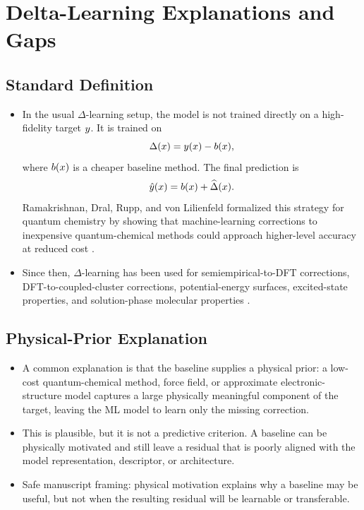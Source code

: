 \documentclass[11pt]{article}
\begin{document}
\section{Delta-Learning Explanations and Gaps}

\subsection*{Standard Definition}

\begin{itemize}
  \item In the usual \(\Delta\)-learning setup, the model is not trained directly on a high-fidelity target \(y\). It is trained on
  \[
    \Delta(x) = y(x) - b(x),
  \]
  where \(b(x)\) is a cheaper baseline method. The final prediction is
  \[
    \hat{y}(x) = b(x) + \widehat{\Delta}(x).
  \]
  Ramakrishnan, Dral, Rupp, and von Lilienfeld formalized this strategy for quantum chemistry by showing that machine-learning corrections to inexpensive quantum-chemical methods could approach higher-level accuracy at reduced cost \cite{ramakrishnan2015delta}.

  \item Since then, \(\Delta\)-learning has been used for semiempirical-to-DFT corrections, DFT-to-coupled-cluster corrections, potential-energy surfaces, excited-state properties, and solution-phase molecular properties \cite{atz2022deltaqml,chen2023solutiondelta,dral2020hierarchical}.
\end{itemize}

\subsection*{Physical-Prior Explanation}

\begin{itemize}
  \item A common explanation is that the baseline supplies a physical prior: a low-cost quantum-chemical method, force field, or approximate electronic-structure model captures a large physically meaningful component of the target, leaving the ML model to learn only the missing correction.

  \item This is plausible, but it is not a predictive criterion. A baseline can be physically motivated and still leave a residual that is poorly aligned with the model representation, descriptor, or architecture.

  \item Safe manuscript framing: physical motivation explains why a baseline may be useful, but not when the resulting residual will be learnable or transferable.
\end{itemize}
\end{document}
